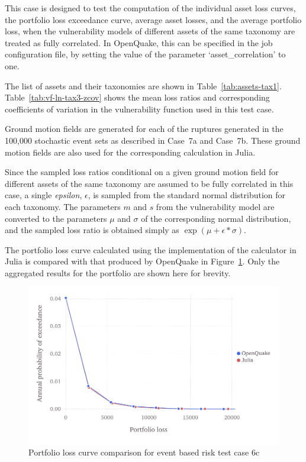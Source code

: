 This case is designed to test the computation of the individual asset loss curves, the portfolio loss exceedance curve, average asset losses, and the average portfolio loss, when the vulnerability models of different assets of the same taxonomy are treated as fully correlated. In OpenQuake, this can be specified in the job configuration file, by setting the value of the parameter `asset\_correlation' to one.

The list of assets and their taxonomies are shown in Table~\ref{tab:assets-tax1}. Table~\ref{tab:vf-ln-tax3-zcov} shows the mean loss ratios and corresponding coefficients of variation in the vulnerability function used in this test case.

Ground motion fields are generated for each of the ruptures generated in the 100,000 stochastic event sets as described in Case~7a and Case~7b. These ground motion fields are also used for the corresponding calculation in Julia.

Since the sampled loss ratios conditional on a given ground motion field for different assets of the same taxonomy are assumed to be fully correlated in this case, a single \emph{epsilon}, $\epsilon$,  is sampled from the standard normal distribution for each taxonomy. The parameters $m$ and $s$ from the vulnerability model are converted to the parameters $\mu$ and $\sigma$ of the corresponding normal distribution, and the sampled loss ratio is obtained simply as $\exp (\mu + \epsilon * \sigma)$.

The portfolio loss curve calculated using the implementation of the calculator in Julia is compared with that produced by OpenQuake in Figure~\ref{fig:lc-ebr-6c}. Only the aggregated results for the portfolio are shown here for brevity.

\begin{figure}[htbp]
\centering
\includegraphics[width=12cm]{qareport/figures/fig-lc-ebr-6c}
\caption{Portfolio loss curve comparison for event based risk test case 6c}
\label{fig:lc-ebr-6c}
\end{figure}